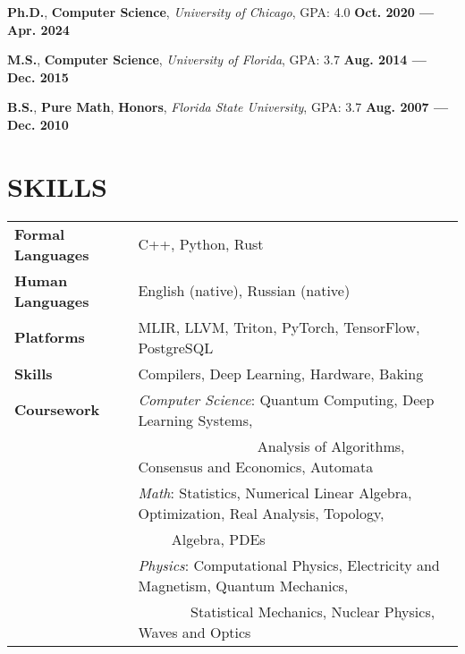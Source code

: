 \documentclass[11pt,letterpaper,roman,colorlinks,linkcolor=blue]{moderncv}
\newcommand*{\modern}{\fontfamily{qhv}\selectfont}
\newcommand{\mystyle}[1]{\textcolor{mygrey}{\modern #1}}
\newcommand{\mysectionstyle}[1]{\large\mystyle{#1}}
\begin{document}
\textbf{Ph.D.}, \textbf{Computer Science}, \emph{University of Chicago}, GPA: 4.0
\hfill \textbf{Oct. 2020 --- Apr. 2024}

\textbf{M.S.}, \textbf{Computer Science}, \emph{University of Florida}, GPA: 3.7
\hfill \textbf{Aug. 2014 --- Dec. 2015}

\textbf{B.S.}, \textbf{Pure Math}, \textbf{Honors}, \emph{Florida State University}, GPA: 3.7
\hfill \textbf{Aug. 2007 --- Dec. 2010}


\section{\mysectionstyle{SKILLS}}

\begin{tabular}{ @{} >{\bfseries}l @{\hspace{6ex}} l }
Formal Languages & C++, Python, Rust \\
Human Languages & English (native), Russian (native) \\
Platforms  & MLIR, LLVM, Triton, PyTorch, TensorFlow, PostgreSQL \\
Skills     & Compilers, Deep Learning, Hardware, Baking \\
Coursework & \textit{Computer Science}: Quantum Computing, Deep Learning Systems, \\
	   & $\qquad$ $\qquad$ $\qquad$ $\quad$ Analysis of Algorithms, Consensus and Economics, Automata \\
           & \textit{Math}: Statistics, Numerical Linear Algebra, Optimization, Real Analysis, Topology, \\
           & $\qquad$ \hspace{0.5ex} Algebra, PDEs  \\
           & \textit{Physics}: Computational Physics, Electricity and Magnetism, Quantum Mechanics, \\ 
           & $\qquad$ $\quad$ \hspace{0.00ex} Statistical Mechanics, Nuclear Physics, Waves and Optics
\end{tabular}

\end{document}
